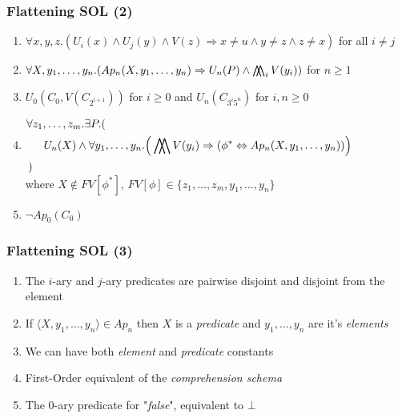 \documentclass{beamer}
\newcommand{\bigdoublewedge}{
  \mathop{
    \mathchoice{\bigwedge\mkern-15mu\bigwedge}
               {\bigwedge\mkern-12.5mu\bigwedge}
               {\bigwedge\mkern-12.5mu\bigwedge}
               {\bigwedge\mkern-11mu\bigwedge}
    }
}
\begin{document}
                \begin{frame}
                    \frametitle{Flattening SOL (2)}
                    \begin{enumerate}
                        \item $ \forall x, y, z.(U_i(x) \wedge U_j(y) \wedge V(z) \Rightarrow x \neq u \wedge y \neq z \wedge z \neq x) $ for all $ i \neq j $
                        \item $ \forall X, y_1, \dots, y_n.(Ap_n(X, y_1, \dots, y_n) \Rightarrow U_n(P) \wedge \bigdoublewedge_i V(y_i)) $ for $ n \geq 1 $
                        \item $ U_0(C_0, V(C_{2^{i + 1}})) $ for $ i \geq 0 $ and $ U_n(C_{3^i5^n}) $ for $ i, n \geq 0 $
                        \item $ \begin{aligned}
                            \forall &z_1, \dots, z_m. \exists P.(\\
                            &\quad U_n(X) \wedge \forall y_1, \dots, y_n. \Big (\bigdoublewedge V(y_i) \Rightarrow (\phi^* \Leftrightarrow Ap_n(X, y_1, \dots, y_n))\Big )\\
                            ) \end{aligned} $ \\[-1\baselineskip]\quad where $ X \not\in FV[\phi^*] $, $ FV[\phi] \in \{ z_1, \dots, z_m, y_1, \dots, y_n \} $
                        \item $ \neg Ap_0(C_0) $
                    \end{enumerate}
                \end{frame}

                \begin{frame}
                    \frametitle{Flattening SOL (3)}
                    \begin{enumerate}
                        \item The $ i $-ary and $ j $-ary predicates are pairwise disjoint and disjoint from the element
                        \item If $ \langle X, y_1, \dots, y_n \rangle \in Ap_n $ then $ X $ is a \textit{predicate} and $ y_1, \dots, y_n $ are it's \textit{elements}
                        \item We can have both \textit{element} and \textit{predicate} constants
                        \item First-Order equivalent of the \textit{comprehension schema}
                        \item The 0-ary predicate for "\textit{false}", equivalent to $ \bot $
                    \end{enumerate}
                \end{frame}
\end{document}

